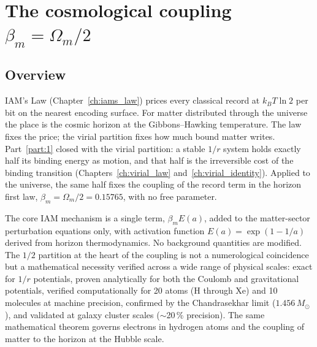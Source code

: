 
\chapter{The cosmological coupling $\beta_m=\Omega_m/2$}\label{ch:virial}

\section*{Overview}
IAM's Law (Chapter~\ref{ch:iams_law}) prices every classical record at $k_BT\ln2$ per bit on the nearest encoding surface. For matter distributed through
the universe the place is the cosmic horizon at the Gibbons--Hawking temperature. The law fixes the price; the virial partition fixes how much bound matter
writes. Part~\ref{part:1} closed with the virial partition: a stable $1/r$ system holds exactly half its binding energy as motion, and that half is the
irreversible cost of the binding transition (Chapters~\ref{ch:virial_law} and~\ref{ch:virial_identity}). Applied to the universe, the same half fixes the
coupling of the record term in the horizon first law, $\beta_m=\Omega_m/2=0.15765$, with no free parameter.

The core IAM mechanism is a single term, $\beta_mE(a)$, added to the matter-sector perturbation equations only, with activation function
$E(a)=\exp(1-1/a)$ derived from horizon thermodynamics. No background quantities are modified. The $1/2$ partition at the heart of the coupling is not a
numerological coincidence but a mathematical necessity verified across a wide range of physical scales: exact for $1/r$ potentials, proven analytically for
both the Coulomb and gravitational potentials, verified computationally for 20 atoms (H through Xe) and 10 molecules at machine precision, confirmed by the
Chandrasekhar limit ($1.456\,M_\odot$), and validated at galaxy cluster scales ($\sim$20\,\% precision). The same mathematical theorem governs electrons in
hydrogen atoms and the coupling of matter to the horizon at the Hubble scale.

